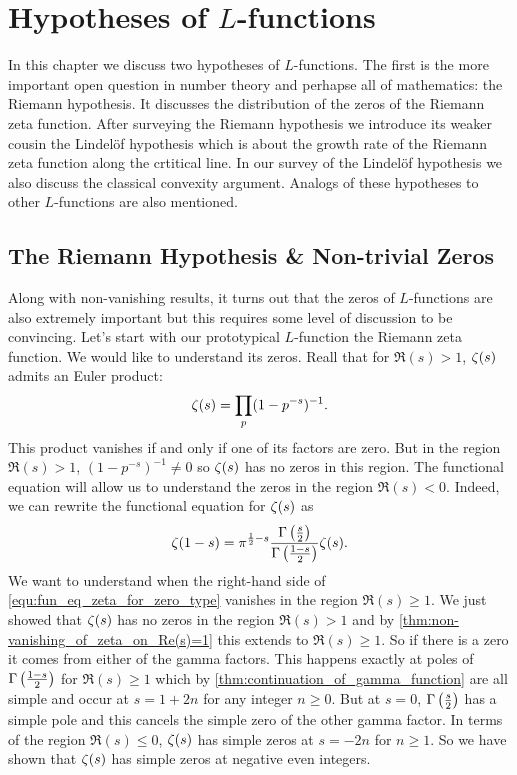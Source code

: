 \chapter{Hypotheses of \texorpdfstring{$L$}{L}-functions}
  In this chapter we discuss two hypotheses of $L$-functions. The first is the more important open question in number theory and perhapse all of mathematics: the Riemann hypothesis. It discusses the distribution of the zeros of the Riemann zeta function. After surveying the Riemann hypothesis we introduce its weaker cousin the Lindel\"of hypothesis which is about the growth rate of the Riemann zeta function along the crtitical line. In our survey of the Lindel\"of hypothesis we also discuss the classical convexity argument. Analogs of these hypotheses to other $L$-functions are also mentioned.
  \section{The Riemann Hypothesis \& Non-trivial Zeros}
      Along with non-vanishing results, it turns out that the zeros of $L$-functions are also extremely important but this requires some level of discussion to be convincing. Let's start with our prototypical $L$-function the Riemann zeta function. We would like to understand its zeros. Reall that for $\Re(s) > 1$, $\zeta(s)$ admits an Euler product:
      \[
        \zeta(s) = \prod_{p}(1-p^{-s})^{-1}.
      \]
      This product vanishes if and only if one of its factors are zero. But in the region $\Re(s) > 1$, $(1-p^{-s})^{-1} \neq 0$ so $\zeta(s)$ has no zeros in this region. The functional equation will allow us to understand the zeros in the region $\Re(s) < 0$. Indeed, we can rewrite the functional equation for $\zeta(s)$ as
      \begin{equation}\label{equ:fun_eq_zeta_for_zero_type}
        \zeta(1-s) = \pi^{\frac{1}{2}-s}\frac{\Gamma\left(\frac{s}{2}\right)}{\Gamma\left(\frac{1-s}{2}\right)}\zeta(s).
      \end{equation}
      We want to understand when the right-hand side of \cref{equ:fun_eq_zeta_for_zero_type} vanishes in the region $\Re(s) \ge 1$. We just showed that $\zeta(s)$ has no zeros in the region $\Re(s) > 1$ and by \cref{thm:non-vanishing_of_zeta_on_Re(s)=1} this extends to $\Re(s) \ge 1$. So if there is a zero it comes from either of the gamma factors. This happens exactly at poles of $\Gamma\left(\frac{1-s}{2}\right)$ for $\Re(s) \ge 1$ which by \cref{thm:continuation_of_gamma_function} are all simple and occur at $s = 1+2n$ for any integer $n \ge 0$. But at $s = 0$, $\Gamma\left(\frac{s}{2}\right)$ has a simple pole and this cancels the simple zero of the other gamma factor. In terms of the region $\Re(s) \le 0$, $\zeta(s)$ has simple zeros at $s = -2n$ for $n \ge 1$. So we have shown that $\zeta(s)$ has simple zeros at negative even integers.

